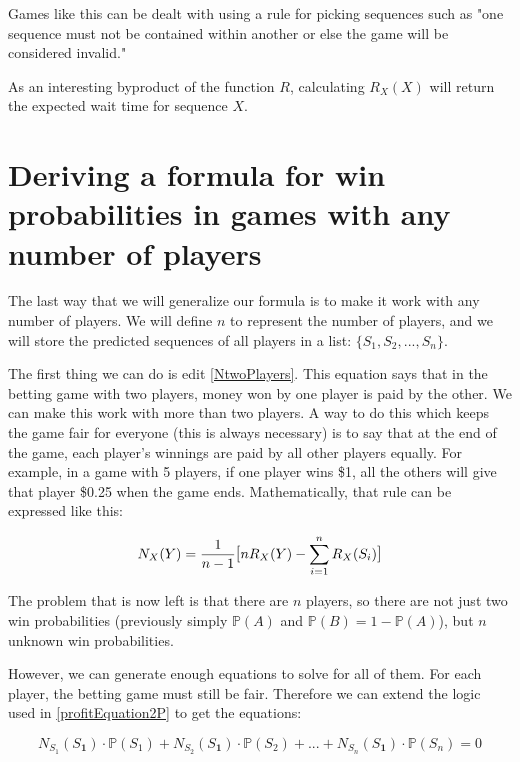 \documentclass[english,12pt,a4paper,final]{article}
\begin{document}
Games like this can be dealt with using a rule for picking sequences such as "one sequence must not be contained within another or else the game will be considered invalid."

As an interesting byproduct of the function $R$, calculating $R_X(X)$ will return the expected wait time for sequence $X$.

\part{Deriving a formula for win probabilities in games with any number of players}

The last way that we will generalize our formula is to make it work with any number of players. We will define $n$ to represent the number of players, and we will store the predicted sequences of all players in a list: $\{S_1, S_2, ..., S_n\}$.

The first thing we can do is edit \eqref{NtwoPlayers}. This equation says that in the betting game with two players, money won by one player is paid by the other. We can make this work with more than two players. A way to do this which keeps the game fair for everyone (this is always necessary) is to say that at the end of the game, each player's winnings are paid by all other players equally. For example, in a game with 5 players, if one player wins \$1, all the others will give that player \$0.25 when the game ends. Mathematically, that rule can be expressed like this:

\begin{equation}\label{Ndef}
	N_{X}(Y) = \frac{1}{n-1} \mathlarger{[}nR_{X}(Y) - \sum_{i=1}^{n}R_{X}(S_i)\mathlarger{]}
\end{equation}

The problem that is now left is that there are $n$ players, so there are not just two win probabilities (previously simply $\mathbb{P}(A)$ and $\mathbb{P}(B) = 1-\mathbb{P}(A)$), but $n$ unknown win probabilities.

However, we can generate enough equations to solve for all of them. For each player, the betting game must still be fair. Therefore we can extend the logic used in \eqref{profitEquation2P} to get the equations:

\begin{equation*}
	N_{S_1}(S_\textbf{1}) \cdot \mathbb{P}(S_1) + N_{S_2}(S_\textbf{1}) \cdot \mathbb{P}(S_2) + ... + N_{S_n}(S_\textbf{1}) \cdot \mathbb{P}(S_n) = 0
\end{equation*}
\end{document}
